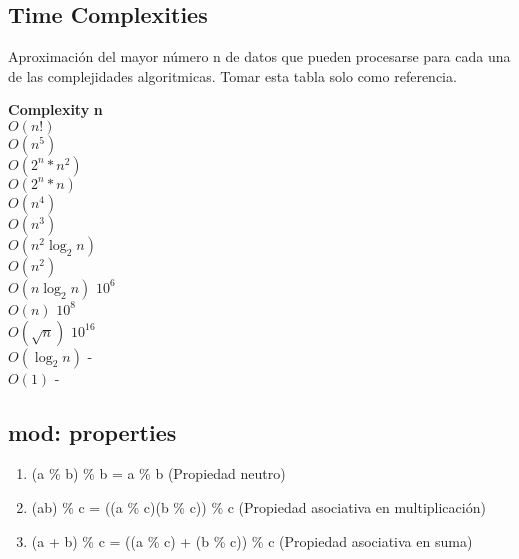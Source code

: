 \documentclass[11pt,letterpaper,twocolumn,twosided]{article}
\begin{document}
\subsection{Time Complexities}

Aproximaci\'on del mayor n\'umero n de datos que pueden procesarse para cada una de las complejidades algoritmicas. Tomar esta tabla solo como referencia.

\begin{tabbing}
\textbf{Complexity}\hspace{4cm} \=  \textbf{n}\hspace{3cm}   \\ 
$O(n!)$ \\ 
$O(n^{5})$ \\ 
$O(2^{n}*n^{2})$ \\ 
$O(2^{n}*n)$ \\ 
$O(n^{4})$ \\ 
$O(n^{3})$ \\ 
$O(n^{2}\log_{2}n)$ \\ 
$O(n^{2})$ \\ 
$O(n\log_{2}n)$ \> $10^{6}$\\ 
$O(n)$ \> $10^{8}$\\ 
$O(\sqrt{n})$ \> $10^{16}$\\ 
$O(\log_{2}n)$ \> -\\ 
$O(1)$ \> -\\ 
\end{tabbing}

\subsection{mod: properties}

\begin{enumerate}
\item (a \% b) \% b = a \% b (Propiedad neutro)
\item (ab) \% c = ((a \% c)(b \% c)) \% c (Propiedad asociativa en multiplicaci\'on)
\item (a + b) \% c = ((a \% c) + (b \% c)) \% c (Propiedad asociativa en suma)
\end{enumerate}
\end{document}
